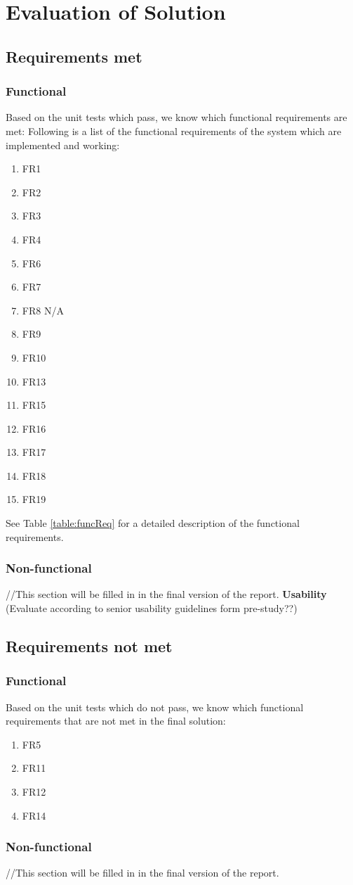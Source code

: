 \chapter{Evaluation of Solution}
\section{Requirements met}
\subsection{Functional}
Based on the unit tests which pass, we know which functional requirements are met:
Following is a list of the functional requirements of the system which are implemented and working: 
\begin{multicols}{3}
\begin{enumerate}
    \item FR1
    \item FR2
    \item FR3
    \item FR4
    \item FR6
    \item FR7
    \item FR8 N/A
    \item FR9
    \item FR10
    \item FR13
    \item FR15
    \item FR16
    \item FR17
    \item FR18
    \item FR19
\end{enumerate}
\end{multicols}

See Table \ref{table:funcReq} for a detailed description of the functional requirements.

\subsection{Non-functional}
//This section will be filled in in the final version of the report.
\textbf{Usability}
(Evaluate according to senior usability guidelines form pre-study??)
\section{Requirements not met}
\subsection{Functional}
Based on the unit tests which do not pass, we know which functional requirements that are not met in the final solution:  
\begin{enumerate}
    \item FR5
    \item FR11
    \item FR12
    \item FR14
\end{enumerate}
\subsection{Non-functional}
//This section will be filled in in the final version of the report.

